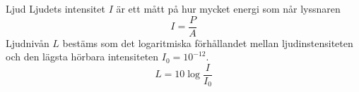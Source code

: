 \documentclass[11pt]{beamer}
\begin{document}
    \begin{frame}
        \begin{block}{Ljud}
            Ljudets intensitet $I$ är ett mått på hur mycket energi som når lyssnaren
            \begin{equation}
                I = \frac{P}{A}
            \end{equation}
            Ljudnivån $L$ bestäms som det logaritmiska förhållandet mellan ljudinstensiteten och den lägsta hörbara intensiteten $I_0 = 10^{-12}$.
            \begin{equation}
                L = 10 \log{\frac{I}{I_0}}
                \end{equation}
        \end{block}
    \end{frame}
\end{document}
